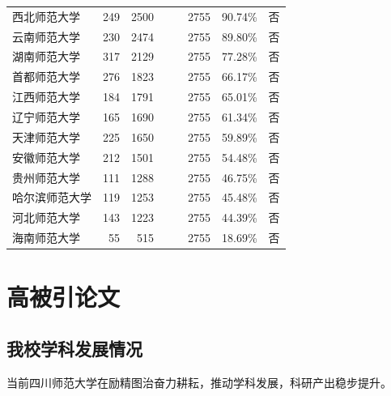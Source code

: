 \documentclass[cn, 11pt, fancy, hide]{elegantbook}
\begin{document}
\begin{table}[!h]
\begin{tabular}[t]{lrrrrrll}
西北师范大学 & 249 & 2500 &  &  & 2755 & 90.74\% & 否\\
云南师范大学 & 230 & 2474 &  &  & 2755 & 89.80\% & 否\\
\addlinespace
湖南师范大学 & 317 & 2129 &  &  & 2755 & 77.28\% & 否\\
首都师范大学 & 276 & 1823 &  &  & 2755 & 66.17\% & 否\\
江西师范大学 & 184 & 1791 &  &  & 2755 & 65.01\% & 否\\
辽宁师范大学 & 165 & 1690 &  &  & 2755 & 61.34\% & 否\\
天津师范大学 & 225 & 1650 &  &  & 2755 & 59.89\% & 否\\
\addlinespace
安徽师范大学 & 212 & 1501 &  &  & 2755 & 54.48\% & 否\\
贵州师范大学 & 111 & 1288 &  &  & 2755 & 46.75\% & 否\\
哈尔滨师范大学 & 119 & 1253 &  &  & 2755 & 45.48\% & 否\\
河北师范大学 & 143 & 1223 &  &  & 2755 & 44.39\% & 否\\
海南师范大学 & 55 & 515 &  &  & 2755 & 18.69\% & 否\\
\bottomrule
\end{tabular}
\end{table}

\hypertarget{highly}{%
\chapter{高被引论文}\label{highly}}

\hypertarget{ux6211ux6821ux5b66ux79d1ux53d1ux5c55ux60c5ux51b5}{%
\section{我校学科发展情况}\label{ux6211ux6821ux5b66ux79d1ux53d1ux5c55ux60c5ux51b5}}

当前四川师范大学在励精图治奋力耕耘，推动学科发展，科研产出稳步提升。
\end{document}
